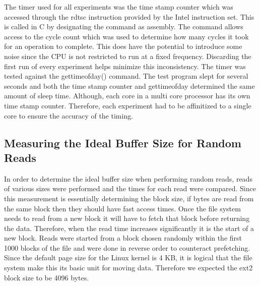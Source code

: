 \documentclass[letterpaper,twocolumn,10pt]{article}
\begin{document}
The timer used for all experiments was the time stamp counter which was accessed through the rdtsc instruction provided by the Intel instruction set. 
This is called in C by designating the command as assembly. 
The command allows access to the cycle count which was used to determine how many cycles it took for an operation to complete. 
This does have the potential to introduce some noise since the CPU is not restricted to run at a fixed frequency. 
Discarding the first run of every experiment helps minimize this inconsistency. 
The timer was tested against the gettimeofday() command. 
The test program slept for several seconds and both the time stamp counter and gettimeofday determined the same amount of sleep time. 
Although, each core in a multi core processor has its own time stamp counter.
Therefore, each experiment had to be affinitized to a single core to ensure the accuracy of the timing. 

\subsection{Measuring the Ideal Buffer Size for Random Reads}

In order to determine the ideal buffer size when performing random reads, reads of various sizes were performed and the times for each read were compared. 
Since this measurement is essentially determining the block size, if bytes are read from the same block then they should have fast access times. 
Once the file system needs to read from a new block it will have to fetch that block before returning the data. 
Therefore, when the read time increases significantly it is the start of a new block.
Reads were started from a block chosen randomly within the first 1000 blocks of the file and were done in reverse order to counteract prefetching. 
Since the default page size for the Linux kernel is 4 KB, it is logical that the file system make this its basic unit for moving data. 
Therefore we expected the ext2 block size to be 4096 bytes.
\end{document}
